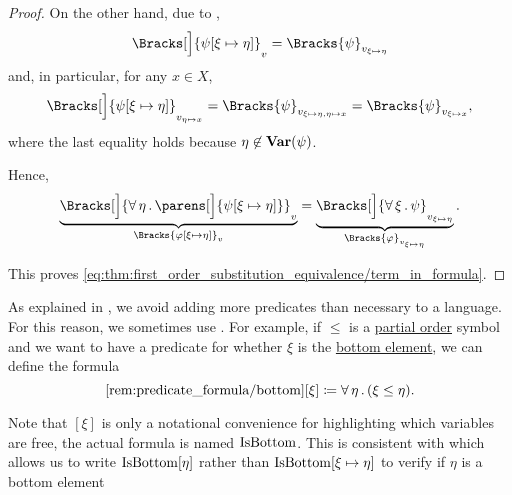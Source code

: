 \begin{proof}
  On the other hand, due to ,
  \begin{equation*}
    \Bracks[\Big]{ \psi[\xi \mapsto \eta] }_v = \Bracks{\psi}_{v_{\xi \mapsto \eta}}
  \end{equation*}
  and, in particular, for any \( x \in X \),
  \begin{equation*}
    \Bracks[\Big]{ \psi[\xi \mapsto \eta] }_{v_{\eta \mapsto x}}
    =
    \Bracks{\psi}_{v_{\xi \mapsto \eta,\eta \mapsto x}}
    =
    \Bracks{\psi}_{v_{\xi \mapsto x}},
  \end{equation*}
  where the last equality holds because \( \eta \not\in \operatorname{\mathbf{Var}}(\psi) \).

  Hence,
  \begin{equation*}
    \underbrace{ \Bracks[\Big]{\qforall \eta \parens[\Big]{ \psi[\xi \mapsto \eta] } }_v }_{\Bracks{\varphi[\xi \mapsto \eta]}_v}
    =
    \underbrace{ \Bracks[\Big]{\qforall \xi \psi }_{v_{\xi \mapsto \eta}} }_{\Bracks{\varphi}_{v_{\xi \mapsto \eta}}}.
  \end{equation*}

  This proves \eqref{eq:thm:first_order_substitution_equivalence/term_in_formula}.
\end{proof}

\begin{remark}\label{rem:predicate_formula}
  As explained in , we avoid adding more predicates than necessary to a language. For this reason, we sometimes use . For example, if \( \leq \) is a \hyperref[def:partially_ordered_set]{partial order} symbol and we want to have a predicate for whether \( \xi \) is the \hyperref[def:extremal_points/top_and_bottom]{bottom element}, we can define the formula
  \begin{equation}\taglabel[\op{IsBottom}]{rem:predicate_formula/bottom}
    \ref{rem:predicate_formula/bottom}[\xi] \coloneqq \qforall \eta (\xi \leq \eta).
  \end{equation}

  Note that \( [\xi] \) is only a notational convenience for highlighting which variables are free, the actual formula is named \( \operatorname{IsBottom} \). This is consistent with  which allows us to write \( \operatorname{IsBottom}[\eta] \) rather than \( \operatorname{IsBottom}[\xi \mapsto \eta] \) to verify if \( \eta \) is a bottom element
\end{remark}

